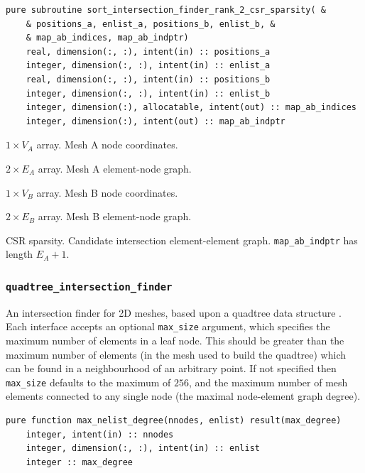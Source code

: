 \documentclass{article}
\begin{document}
\begin{lstlisting}[language=FORTRAN]
  pure subroutine sort_intersection_finder_rank_2_csr_sparsity( &
    & positions_a, enlist_a, positions_b, enlist_b, &
    & map_ab_indices, map_ab_indptr)
    real, dimension(:, :), intent(in) :: positions_a
    integer, dimension(:, :), intent(in) :: enlist_a
    real, dimension(:, :), intent(in) :: positions_b
    integer, dimension(:, :), intent(in) :: enlist_b
    integer, dimension(:), allocatable, intent(out) :: map_ab_indices
    integer, dimension(:), intent(out) :: map_ab_indptr
\end{lstlisting}

\begin{description}[font=\ttfamily\bfseries,leftmargin=2.2\parindent,labelindent=1.7\parindent,noitemsep]
  \item[positions\_a] $1 \times V_A$ array. Mesh A node coordinates.
  \item[enlist\_a] $2 \times E_A$ array. Mesh A element-node graph.
  \item[positions\_b] $1 \times V_B$ array. Mesh B node coordinates.
  \item[enlist\_b] $2 \times E_B$ array. Mesh B element-node graph.
  \item[map\_ab\_indices, map\_ab\_indptr] CSR sparsity. Candidate intersection
    element-element graph. \linebreak \verb+map_ab_indptr+ has length $E_A + 1$.
\end{description}

\subsubsection{\texttt{quadtree\_intersection\_finder}}\label{sect:quadtree_global}

An intersection finder for 2D meshes, based upon a quadtree data structure
\citep{samet1984}. Each interface accepts an optional \verb+max_size+ argument,
which specifies the maximum number of elements in a leaf node. This should be
greater than the maximum number of elements (in the mesh used to build the
quadtree) which can be found in a neighbourhood of an arbitrary point. If not
specified then \verb+max_size+ defaults to the maximum of $256$, and the maximum
number of mesh elements connected to any single node (the maximal node-element
graph degree).

\begin{lstlisting}[language=FORTRAN]  
  pure function max_nelist_degree(nnodes, enlist) result(max_degree)
    integer, intent(in) :: nnodes
    integer, dimension(:, :), intent(in) :: enlist
    integer :: max_degree
\end{lstlisting}
\end{document}
